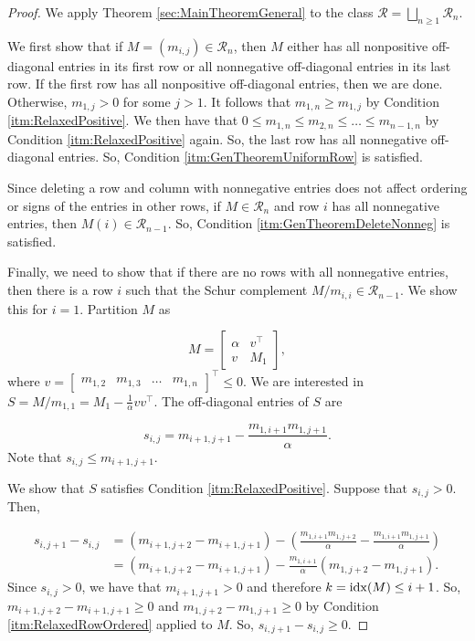 \documentclass{amsart}
\def\idx{{\rm idx}}
\newcommand{\cR}{\mathcal{R}}
\theoremstyle{definition}
\begin{document}
\begin{proof}
We apply Theorem \ref{sec:MainTheoremGeneral} to the class $\cR = \bigsqcup_{n \geq 1}\cR_n$. 

We first show that if $M = (m_{i,j}) \in \cR_n$, then $M$ either has all nonpositive off-diagonal entries in its first row or all nonnegative off-diagonal entries in its last row. If the first row has all nonpositive off-diagonal entries, then we are done. Otherwise, $m_{1,j}>0$ for some $j > 1$. It follows that $m_{1,n} \geq m_{1,j}$ by Condition \ref{itm:RelaxedPositive}. We then have that $0\leq m_{1,n} \leq m_{2,n}\leq \dots \leq m_{n-1,n}$ by Condition \ref{itm:RelaxedPositive} again. So, the last row has all nonnegative off-diagonal entries. So, Condition \ref{itm:GenTheoremUniformRow} is satisfied. 

Since deleting a row and column with nonnegative entries does not affect ordering or signs of the entries in other rows, if $M \in \cR_n$ and row $i$ has all nonnegative entries, then $M(i) \in \cR_{n-1}$. So, Condition \ref{itm:GenTheoremDeleteNonneg} is satisfied. 

Finally, we need to show that if there are no rows with all nonnegative entries, then there is a row $i$ such that the Schur complement $M/m_{i,i} \in \cR_{n-1}$. We show this for $i = 1$. Partition $M$ as 

\[M = \begin{bmatrix} \alpha & v^\top\\ v & M_1\end{bmatrix},\]
%
where $v = \begin{bmatrix} m_{1,2} & m_{1,3} & \dots & m_{1,n}\end{bmatrix}^\top\leq 0$. We are interested in $S = M/m_{1,1} = M_1 - \frac{1}{\alpha} vv^\top$. The off-diagonal entries of $S$ are 

\[s_{i,j} = m_{i+1,j+1} - \frac{m_{1,i+1}m_{1,j+1}}{\alpha}.\]
%
Note that $s_{i,j}\leq m_{i+1,j+1}$. 

We show that $S$ satisfies Condition \ref{itm:RelaxedPositive}. Suppose that $s_{i,j} > 0$. Then, 

\[\begin{aligned}
    s_{i,j+1} - s_{i,j} &= \left(m_{i+1,j+2} - m_{i+1,j+1}\right) - \left(\frac{m_{1,i+1}m_{1,j+2}}{\alpha} - \frac{m_{1,i+1}m_{1,j+1}}{\alpha}\right)\\
    &= \left(m_{i+1,j+2} - m_{i+1,j+1}\right) - \frac{m_{1,i+1}}{\alpha}\left(m_{1,j+2} - m_{1,j+1}\right).
\end{aligned}\]
%
Since $s_{i,j} > 0$, we have that $m_{i+1,j+1} > 0$ and therefore $k = \idx(M) \leq i+1$. So, $m_{i+1,j+2} - m_{i+1,j+1} \geq 0$ and $m_{1,j+2} - m_{1,j+1} \geq 0$ by Condition \ref{itm:RelaxedRowOrdered} applied to $M$. So, $s_{i,j+1} -s_{i,j} \geq 0$.


\end{proof}
\end{document}
